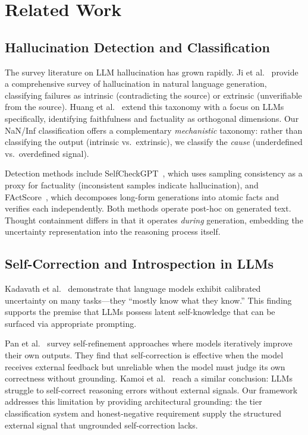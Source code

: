 \documentclass[11pt]{article}
\theoremstyle{definition}
\theoremstyle{remark}
\begin{document}
\section{Related Work}
\label{sec:related-work}

\subsection{Hallucination Detection and Classification}
\label{sec:related-hallucination}

The survey literature on LLM hallucination has grown rapidly.
Ji et al.~\cite{ji2023survey} provide a comprehensive survey of
hallucination in natural language generation, classifying failures as
intrinsic (contradicting the source) or extrinsic (unverifiable from the
source).  Huang et al.~\cite{huang2023survey} extend this taxonomy with a
focus on LLMs specifically, identifying faithfulness and factuality as
orthogonal dimensions.  Our NaN/Inf classification offers a complementary
\emph{mechanistic} taxonomy: rather than classifying the output (intrinsic
vs.\ extrinsic), we classify the \emph{cause} (underdefined vs.\
overdefined signal).

Detection methods include SelfCheckGPT~\cite{manakul2023selfcheckgpt},
which uses sampling consistency as a proxy for factuality (inconsistent
samples indicate hallucination), and FActScore~\cite{min2023factscore},
which decomposes long-form generations into atomic facts and verifies each
independently.  Both methods operate post-hoc on generated text.  Thought
containment differs in that it operates \emph{during} generation, embedding
the uncertainty representation into the reasoning process itself.

\subsection{Self-Correction and Introspection in LLMs}
\label{sec:related-self-correction}

Kadavath et al.~\cite{kadavath2022llm} demonstrate that language models
exhibit calibrated uncertainty on many tasks---they ``mostly know what they
know.''  This finding supports the premise that LLMs possess latent
self-knowledge that can be surfaced via appropriate prompting.

Pan et al.~\cite{pan2024self} survey self-refinement approaches where
models iteratively improve their own outputs.  They find that self-correction
is effective when the model receives external feedback but unreliable when
the model must judge its own correctness without grounding.
Kamoi et al.~\cite{kamoi2024self} reach a similar conclusion: LLMs struggle
to self-correct reasoning errors without external signals.  Our framework
addresses this limitation by providing architectural grounding: the tier
classification system and honest-negative requirement supply the structured
external signal that ungrounded self-correction lacks.
\end{document}
